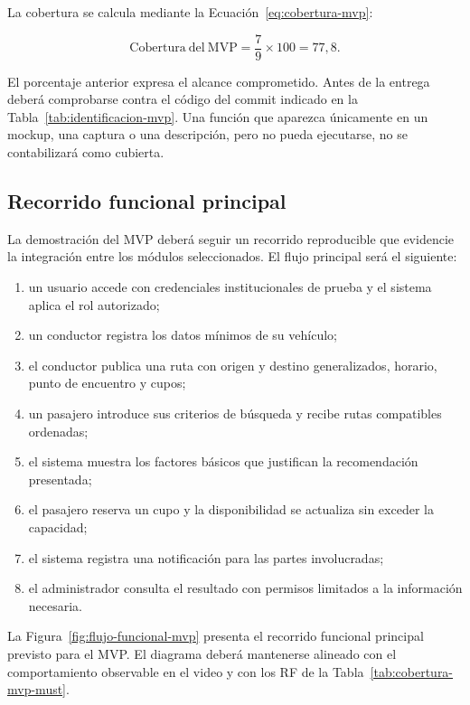 \documentclass[12pt,a4paper]{article}
\begin{document}
La cobertura se calcula mediante la Ecuación~\ref{eq:cobertura-mvp}:

\begin{equation}
\mathrm{Cobertura\ del\ MVP}=\frac{7}{9}\times 100=77{,}8.
\label{eq:cobertura-mvp}
\end{equation}

El porcentaje anterior expresa el alcance comprometido. Antes de la entrega deberá comprobarse contra el código del commit indicado en la Tabla~\ref{tab:identificacion-mvp}. Una función que aparezca únicamente en un mockup, una captura o una descripción, pero no pueda ejecutarse, no se contabilizará como cubierta.

\subsection{Recorrido funcional principal}

La demostración del MVP deberá seguir un recorrido reproducible que evidencie la integración entre los módulos seleccionados. El flujo principal será el siguiente:

\begin{enumerate}
  \item un usuario accede con credenciales institucionales de prueba y el sistema aplica el rol autorizado;
  \item un conductor registra los datos mínimos de su vehículo;
  \item el conductor publica una ruta con origen y destino generalizados, horario, punto de encuentro y cupos;
  \item un pasajero introduce sus criterios de búsqueda y recibe rutas compatibles ordenadas;
  \item el sistema muestra los factores básicos que justifican la recomendación presentada;
  \item el pasajero reserva un cupo y la disponibilidad se actualiza sin exceder la capacidad;
  \item el sistema registra una notificación para las partes involucradas;
  \item el administrador consulta el resultado con permisos limitados a la información necesaria.
\end{enumerate}

La Figura~\ref{fig:flujo-funcional-mvp} presenta el recorrido funcional principal previsto para el MVP. El diagrama deberá mantenerse alineado con el comportamiento observable en el video y con los RF de la Tabla~\ref{tab:cobertura-mvp-must}.
\end{document}
